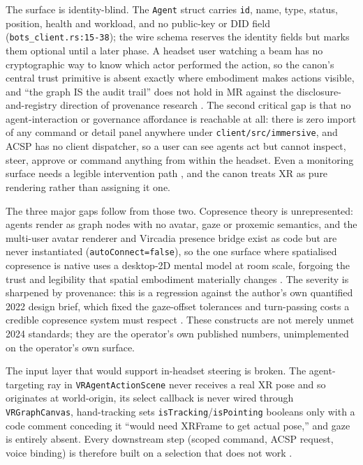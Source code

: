 The surface is identity-blind. The \texttt{Agent} struct carries \texttt{id}, name, type, status, position, health and workload, and no public-key or DID field (\texttt{bots\_client.rs:15-38}); the wire schema reserves the identity fields but marks them optional until a later phase. A headset user watching a beam has no cryptographic way to know which actor performed the action, so the canon's central trust primitive is absent exactly where embodiment makes actions visible, and ``the graph IS the audit trail'' does not hold in MR against the disclosure-and-registry direction of provenance research \parencite{Souza2025ProvAgent}. The second critical gap is that no agent-interaction or governance affordance is reachable at all: there is zero import of any command or detail panel anywhere under \texttt{client/src/immersive}, and ACSP has no client dispatcher, so a user can see agents act but cannot inspect, steer, approve or command anything from within the headset. Even a monitoring surface needs a legible intervention path \parencite{Epperson2025Debugging}, and the canon treats XR as pure rendering rather than assigning it one.

The three major gaps follow from those two. Copresence theory is unrepresented: agents render as graph nodes with no avatar, gaze or proxemic semantics, and the multi-user avatar renderer and Vircadia presence bridge exist as code but are never instantiated (\texttt{autoConnect=false}), so the one surface where spatialised copresence is native uses a desktop-2D mental model at room scale, forgoing the trust and legibility that spatial embodiment materially changes \parencite{Schmid2024Objects}. The severity is sharpened by provenance: this is a regression against the author's own quantified 2022 design brief, which fixed the gaze-offset tolerances and turn-passing costs a credible copresence system must respect \parencite{OHare2022Convergence}. These constructs are not merely unmet 2024 standards; they are the operator's own published numbers, unimplemented on the operator's own surface.

The input layer that would support in-headset steering is broken. The agent-targeting ray in \texttt{VRAgentActionScene} never receives a real XR pose and so originates at world-origin, its select callback is never wired through \texttt{VRGraphCanvas}, hand-tracking sets \texttt{isTracking}/\texttt{isPointing} booleans only with a code comment conceding it ``would need XRFrame to get actual pose,'' and gaze is entirely absent. Every downstream step (scoped command, ACSP request, voice binding) is therefore built on a selection that does not work \parencite{SpeakStaySilent2026}.

